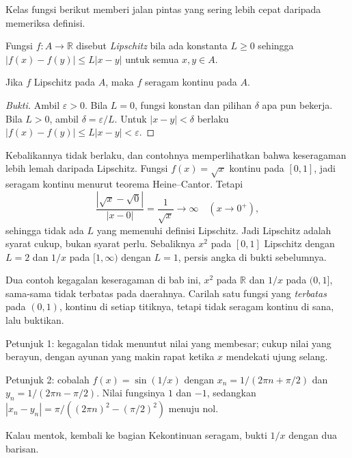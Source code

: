 Kelas fungsi berikut memberi jalan pintas yang sering lebih cepat daripada memeriksa
definisi.

\begin{definisi}[Lipschitz]
Fungsi $f\colon A\to\mathbb{R}$ disebut \emph{Lipschitz} bila ada konstanta $L\ge 0$
sehingga $|f(x)-f(y)|\le L|x-y|$ untuk semua $x,y\in A$.
\end{definisi}

\begin{proposisi}
Jika $f$ Lipschitz pada $A$, maka $f$ seragam kontinu pada $A$.
\end{proposisi}

\begin{proof}[Bukti]
Ambil $\varepsilon>0$. Bila $L=0$, fungsi konstan dan pilihan $\delta$ apa pun bekerja.
Bila $L>0$, ambil $\delta=\varepsilon/L$. Untuk $|x-y|<\delta$ berlaku
$|f(x)-f(y)|\le L|x-y|<\varepsilon$.
\end{proof}

Kebalikannya tidak berlaku, dan contohnya memperlihatkan bahwa keseragaman lebih
lemah daripada Lipschitz. Fungsi $f(x)=\sqrt{x}$ kontinu pada $[0,1]$, jadi seragam
kontinu menurut teorema Heine--Cantor. Tetapi
\[
\frac{|\sqrt{x}-\sqrt{0}|}{|x-0|}=\frac{1}{\sqrt{x}}\longrightarrow\infty
\quad (x\to 0^{+}),
\]
sehingga tidak ada $L$ yang memenuhi definisi Lipschitz. Jadi Lipschitz adalah syarat
cukup, bukan syarat perlu. Sebaliknya $x^{2}$ pada $[0,1]$ Lipschitz dengan $L=2$
dan $1/x$ pada $[1,\infty)$ dengan $L=1$, persis angka di bukti sebelumnya.

\begin{tantangan}
Dua contoh kegagalan keseragaman di bab ini, $x^{2}$ pada $\mathbb{R}$ dan $1/x$ pada
$(0,1]$, sama-sama tidak terbatas pada daerahnya. Carilah satu fungsi yang
\emph{terbatas} pada $(0,1)$, kontinu di setiap titiknya, tetapi tidak seragam kontinu
di sana, lalu buktikan.

Petunjuk 1: kegagalan tidak menuntut nilai yang membesar; cukup nilai yang berayun,
dengan ayunan yang makin rapat ketika $x$ mendekati ujung selang.

Petunjuk 2: cobalah $f(x)=\sin(1/x)$ dengan $x_{n}=1/(2\pi n+\pi/2)$ dan
$y_{n}=1/(2\pi n-\pi/2)$. Nilai fungsinya $1$ dan $-1$, sedangkan
$|x_{n}-y_{n}|=\pi/((2\pi n)^{2}-(\pi/2)^{2})$ menuju nol.

Kalau mentok, kembali ke bagian Kekontinuan seragam, bukti $1/x$ dengan dua barisan.
\end{tantangan}

